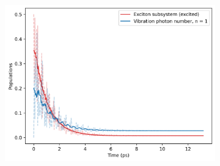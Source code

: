 \documentclass[11pt]{article}
\begin{document}
\begin{figure}[H]
    \vspace{0.5cm}
    
    \begin{subfigure}{0.45\textwidth}
        \centering
        \includegraphics[width=\linewidth]{Research Project/Code/results/ExVib/Open/Population/pops_ex_both_eg.png}
        \caption{}
        \label{fig:EVM_OQS_Pop_both_eg}
    \end{subfigure}
    \hfill

    \caption{}
    \label{fig:EVM_OQS_Pop_eg}
\end{figure}
\end{document}
